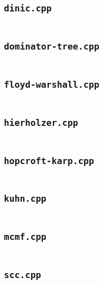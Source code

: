 \subsection*{\texttt{dinic.cpp}} \label{sec:3_3_Graph_file6}
\inputminted[fontsize=\footnotesize, linenos, breaklines]{cpp}{./3\ Graph/dinic.cpp}

\subsection*{\texttt{dominator-tree.cpp}} \label{sec:3_3_Graph_file7}
\inputminted[fontsize=\footnotesize, linenos, breaklines]{cpp}{./3\ Graph/dominator-tree.cpp}

\subsection*{\texttt{floyd-warshall.cpp}} \label{sec:3_3_Graph_file8}
\inputminted[fontsize=\footnotesize, linenos, breaklines]{cpp}{./3\ Graph/floyd-warshall.cpp}

\subsection*{\texttt{hierholzer.cpp}} \label{sec:3_3_Graph_file9}
\inputminted[fontsize=\footnotesize, linenos, breaklines]{cpp}{./3\ Graph/hierholzer.cpp}

\subsection*{\texttt{hopcroft-karp.cpp}} \label{sec:3_3_Graph_file10}
\inputminted[fontsize=\footnotesize, linenos, breaklines]{cpp}{./3\ Graph/hopcroft-karp.cpp}

\subsection*{\texttt{kuhn.cpp}} \label{sec:3_3_Graph_file11}
\inputminted[fontsize=\footnotesize, linenos, breaklines]{cpp}{./3\ Graph/kuhn.cpp}

\subsection*{\texttt{mcmf.cpp}} \label{sec:3_3_Graph_file12}
\inputminted[fontsize=\footnotesize, linenos, breaklines]{cpp}{./3\ Graph/mcmf.cpp}

\subsection*{\texttt{scc.cpp}} \label{sec:3_3_Graph_file13}
\inputminted[fontsize=\footnotesize, linenos, breaklines]{cpp}{./3\ Graph/scc.cpp}


